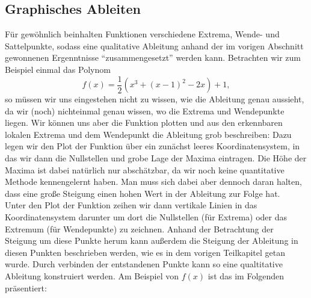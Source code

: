 \documentclass[../../main.tex]{subfiles}
\begin{document}
    \subsection{Graphisches Ableiten}
    Für gewöhnlich beinhalten Funktionen verschiedene Extrema, Wende- und Sattelpunkte, sodass eine qualitative Ableitung anhand der im vorigen Abschnitt gewonnenen Ergenntnisse \enquote{zusammengesetzt} werden kann.
    Betrachten wir zum Beispiel einmal das Polynom
    \[f(x) = \frac{1}{2}\left( x^3 + (x-1)^2 - 2x\right)+1,\]
    so müssen wir uns eingestehen nicht zu wissen, wie die Ableitung genau aussieht, da wir (noch) nichteinmal genau wissen, wo die Extrema und Wendepunkte liegen. Wir können uns aber die Funktion plotten und aus den erkennbaren lokalen Extrema und dem Wendepunkt die Ableitung grob beschreiben: Dazu legen wir den Plot der Funktion über ein zunächst leeres Koordinatensystem, in das wir dann die Nullstellen und grobe Lage der Maxima eintragen. Die Höhe der Maxima ist dabei natürlich nur abschätzbar, da wir noch keine quantitative Methode kennengelernt haben. Man muss sich dabei aber dennoch daran halten, dass eine große Steigung einen hohen Wert in der Ableitung zur Folge hat.\\
    Unter den Plot der Funktion zeihen wir dann vertikale Linien in das Koordinatensystem darunter um dort die Nullstellen (für Extrema) oder das Extremum (für Wendepunkte) zu zeichnen. Anhand der Betrachtung der Steigung um diese Punkte herum kann außerdem die Steigung der Ableitung in diesen Punkten beschrieben werden, wie es in dem vorigen Teilkapitel getan wurde. Durch verbinden der entstandenen Punkte kann so eine qualtitative Ableitung konstruiert werden. Am Beispiel von $f(x)$ ist das im Folgenden präsentiert:
    \begin{center}\normalsize
    \end{center}
             
\end{document}
